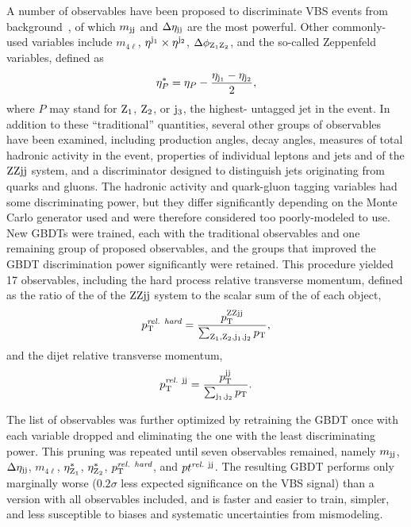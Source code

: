 A number of observables have been proposed to discriminate VBS events from background~\cite{Zeppenfeld:54.6680}, of which $m_{\mathrm{j}\mathrm{j}}$ and $\Delta\eta_{\mathrm{j}\mathrm{j}}$ are the most powerful.
Other commonly-used variables include $m_{4\ell}$, $\eta^{\mathrm{j}_1} \times \eta^{\mathrm{j}_2}$, $\Delta\phi_{\mathrm{Z}_1\mathrm{Z}_2}$, and the so-called Zeppenfeld variables, defined as
\begin{equation}
  \eta^\ast_P = \eta_P - \frac{\eta_{\mathrm{j}_1} - \eta_{\mathrm{j}_2}}{2},
\end{equation}
where $P$ may stand for $\mathrm{Z}_1$, $\mathrm{Z}_2$, or $\mathrm{j}_3$, the highest-{\pt} untagged jet in the event.
In addition to these ``traditional'' quantities, several other groups of observables have been examined, including production angles, decay angles, measures of total hadronic activity in the event, properties of individual leptons and jets and of the $\mathrm{Z}\mathrm{Z}\mathrm{j}\mathrm{j}$ system, and a discriminator designed to distinguish jets originating from quarks and gluons.
The hadronic activity and quark-gluon tagging variables had some discriminating power, but they differ significantly depending on the Monte Carlo generator used and were therefore considered too poorly-modeled to use.
New GBDTs were trained, each with the traditional observables and one remaining group of proposed observables, and the groups that improved the GBDT discrimination power significantly were retained.
This procedure yielded 17 observables, including the hard process relative transverse momentum, defined as the ratio of the {\pt} of the $\mathrm{Z}\mathrm{Z}\mathrm{j}\mathrm{j}$ system to the scalar sum of the {\pt} of each object,
\begin{equation}
  p_\mathrm{T}^\textit{rel. hard} = \frac{p_\mathrm{T}^{\mathrm{Z}\mathrm{Z}\mathrm{j}\mathrm{j}}}{\sum_{\mathrm{Z}_1,\mathrm{Z}_2,\mathrm{j}_1,\mathrm{j}_2} p_\mathrm{T}},
\end{equation}
and the dijet relative transverse momentum,
\begin{equation}
  p_\mathrm{T}^{\textit{rel.}\ \mathrm{j}\mathrm{j}} = \frac{p_\mathrm{T}^{\mathrm{j}\mathrm{j}}}{\sum_{\mathrm{j}_1,\mathrm{j}_2} p_\mathrm{T}}.
\end{equation}

The list of observables was further optimized by retraining the GBDT once with each variable dropped and eliminating the one with the least discriminating power.
This pruning was repeated until seven observables remained, namely $m_{\mathrm{j}\mathrm{j}}$, $\Delta\eta_{\mathrm{j}\mathrm{j}}$, $m_{4\ell}$, $\eta^\ast_{\mathrm{Z}_1}$, $\eta^\ast_{\mathrm{Z}_2}$, $p_\mathrm{T}^\textit{rel. hard}$, and $pt^{\textit{rel.}\ \mathrm{j}\mathrm{j}}$.
The resulting GBDT performs only marginally worse ($0.2\sigma$ less expected significance on the VBS signal) than a version with all observables included, and is faster and easier to train, simpler, and less susceptible to biases and systematic uncertainties from mismodeling.

